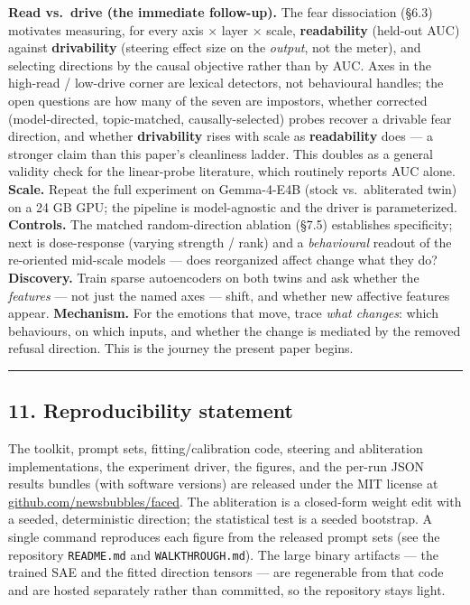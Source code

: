 \documentclass[
]{article}
\begin{document}
\textbf{Read vs.~drive (the immediate follow-up).} The fear dissociation
(§6.3) motivates measuring, for every axis × layer × scale,
\textbf{readability} (held-out AUC) against \textbf{drivability}
(steering effect size on the \emph{output}, not the meter), and
selecting directions by the causal objective rather than by AUC. Axes in
the high-read / low-drive corner are lexical detectors, not behavioural
handles; the open questions are how many of the seven are impostors,
whether corrected (model-directed, topic-matched, causally-selected)
probes recover a drivable fear direction, and whether
\textbf{drivability} rises with scale as \textbf{readability} does --- a
stronger claim than this paper's cleanliness ladder. This doubles as a
general validity check for the linear-probe literature, which routinely
reports AUC alone. \textbf{Scale.} Repeat the full experiment on
Gemma-4-E4B (stock vs.~abliterated twin) on a 24 GB GPU; the pipeline is
model-agnostic and the driver is parameterized. \textbf{Controls.} The
matched random-direction ablation (§7.5) establishes specificity; next
is dose-response (varying strength / rank) and a \emph{behavioural}
readout of the re-oriented mid-scale models --- does reorganized affect
change what they do? \textbf{Discovery.} Train sparse autoencoders on
both twins and ask whether the \emph{features} --- not just the named
axes --- shift, and whether new affective features appear.
\textbf{Mechanism.} For the emotions that move, trace \emph{what
changes}: which behaviours, on which inputs, and whether the change is
mediated by the removed refusal direction. This is the journey the
present paper begins.

\begin{center}\rule{0.5\linewidth}{0.5pt}\end{center}

\subsection{11. Reproducibility
statement}\label{reproducibility-statement}

The toolkit, prompt sets, fitting/calibration code, steering and
abliteration implementations, the experiment driver, the figures, and
the per-run JSON results bundles (with software versions) are released
under the MIT license at
\href{https://github.com/newsbubbles/faced}{github.com/newsbubbles/faced}.
The abliteration is a closed-form weight edit with a seeded,
deterministic direction; the statistical test is a seeded bootstrap. A
single command reproduces each figure from the released prompt sets (see
the repository \texttt{README.md} and \texttt{WALKTHROUGH.md}). The
large binary artifacts --- the trained SAE and the fitted direction
tensors --- are regenerable from that code and are hosted separately
rather than committed, so the repository stays light.
\end{document}
